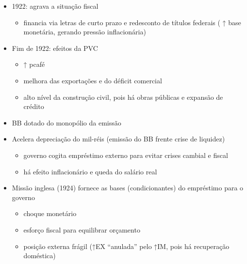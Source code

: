 \documentclass[a4paper,12pt]{article}[abntex2]
\begin{document}
\begin{itemize}
\item 1922: agrava a situação fiscal
\begin{itemize}
    \item financia via letras de curto prazo e redesconto de títulos federais ( ↑ base monetária, gerando pressão inflacionária)
\end{itemize}
\item Fim de 1922: efeitos da PVC
\begin{itemize}
    \item  ↑ pcafé
\end{itemize}
\begin{itemize}
    \item melhora das exportações e do déficit comercial
\end{itemize}
\begin{itemize}
    \item  alto nível da construção civil, pois há obras públicas e expansão de crédito
\end{itemize}
\item BB dotado do monopólio da emissão
\item Acelera depreciação do mil-réis (emissão do BB frente crise de liquidez)
\begin{itemize}
    \item governo cogita empréstimo externo para evitar crises cambial e fiscal
\end{itemize}
\begin{itemize}
    \item há efeito inflacionário e queda do salário real
\end{itemize}
\item Missão inglesa (1924) fornece as bases (condicionantes) do empréstimo para o governo
\begin{itemize}
    \item choque monetário
\end{itemize}
\begin{itemize}
    \item esforço fiscal para equilibrar orçamento
\end{itemize}
\begin{itemize}
    \item posição externa frágil (↑EX “anulada” pelo ↑IM, pois há recuperação doméstica)
\end{itemize}
\end{itemize}
\end{document}
